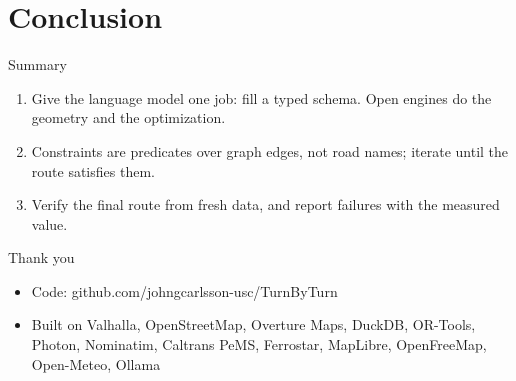 \documentclass[aspectratio=169]{beamer}
\begin{document}
\section{Conclusion}

\begin{frame}{Summary}
  \begin{enumerate}
    \item Give the language model one job: fill a typed schema. Open engines do the geometry and the optimization.
    \item Constraints are predicates over graph edges, not road names; iterate until the route satisfies them.
    \item Verify the final route from fresh data, and report failures with the measured value.
  \end{enumerate}
\end{frame}

\begin{frame}{Thank you}
  \begin{itemize}
    \item Code: github.com/johngcarlsson-usc/TurnByTurn
    \item Built on Valhalla, OpenStreetMap, Overture Maps, DuckDB, OR-Tools, Photon, Nominatim, Caltrans PeMS, Ferrostar, MapLibre, OpenFreeMap, Open-Meteo, Ollama
  \end{itemize}
\end{frame}
\end{document}
